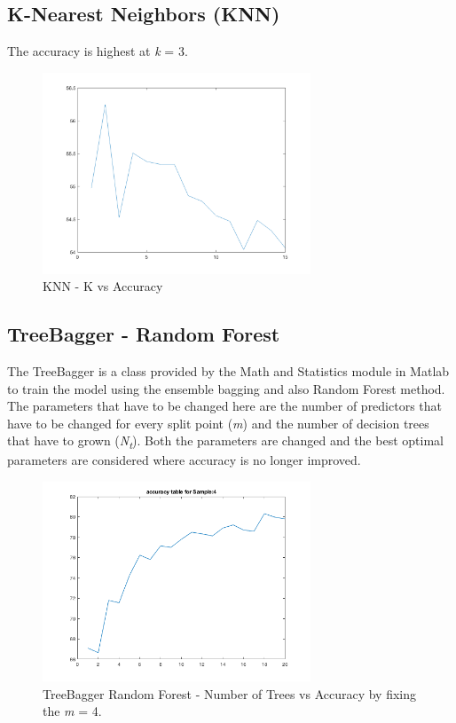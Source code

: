 \documentclass[journal, a4paper]{IEEEtran}
\begin{document}
\subsection{K-Nearest Neighbors (KNN)}
The accuracy is highest at \textit{k} = 3.
\begin{figure}[ht!]
\centering
\includegraphics[width=80mm]{images/KNNClassifier.png}
\caption{KNN - K vs Accuracy}
\label{knnresults}
\end{figure}

\subsection{TreeBagger - Random Forest}
The TreeBagger is a class provided by the Math and Statistics module in Matlab to train the model using the ensemble bagging and also Random Forest method. The parameters that have to be changed here are the number of predictors that have to be changed for every split point (\textit{m}) and the number of decision trees that have to grown (\textit{N\textsubscript{t}}). Both the parameters are changed and the best optimal parameters are considered where accuracy is no longer improved.

\begin{figure}[ht!]
\centering
\includegraphics[width=80mm]{images/TBRF_num_predict_4.png}
\caption{TreeBagger Random Forest - Number of Trees vs Accuracy by fixing the \textit{m} = 4.}
\label{tbrfnumpred4}
\end{figure}
\end{document}
